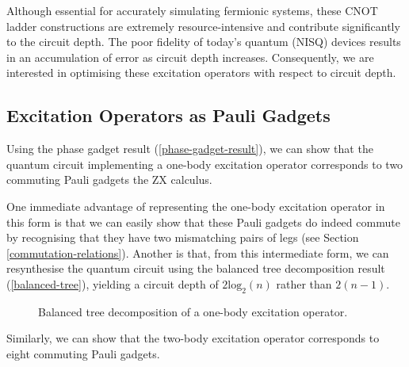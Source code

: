 Although essential for accurately simulating fermionic systems, these CNOT ladder constructions are extremely resource-intensive and contribute significantly to the circuit depth. The poor fidelity of today's quantum (NISQ) devices results in an accumulation of error as circuit depth increases. Consequently, we are interested in optimising these excitation operators with respect to circuit depth.

\subsection{Excitation Operators as Pauli Gadgets}%
\label{excitation-operators-pauli-gadgets}

Using the phase gadget result (\ref{phase-gadget-result}), we can show that the quantum circuit implementing a one-body excitation operator corresponds to two commuting Pauli gadgets the ZX calculus.


One immediate advantage of representing the one-body excitation operator in this form is that we can easily show that these Pauli gadgets do indeed commute by recognising that they have two mismatching pairs of legs (see Section \ref{commutation-relations}). Another is that, from this intermediate form, we can resynthesise the quantum circuit using the balanced tree decomposition result (\ref{balanced-tree}), yielding a circuit depth of $2\text{log}_2(n)$ rather than $2(n-1)$.

\begin{figure}[H]
    \centering
    \caption{Balanced tree decomposition of a one-body excitation operator.}
\end{figure}

Similarly, we can show that the two-body excitation operator corresponds to eight commuting Pauli gadgets.

